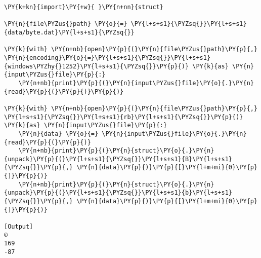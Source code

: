 \begin{Verbatim}[label=\makebox{\href{https://github.com/unipi-physics-labs/lab1-notes/tree/main/snippy/byte.py}{https://github.com/.../byte.py}},commandchars=\\\{\}]
\PY{k+kn}{import}\PY{+w}{ }\PY{n+nn}{struct}

\PY{n}{file\PYZus{}path} \PY{o}{=} \PY{l+s+s1}{\PYZsq{}}\PY{l+s+s1}{data/byte.dat}\PY{l+s+s1}{\PYZsq{}}

\PY{k}{with} \PY{n+nb}{open}\PY{p}{(}\PY{n}{file\PYZus{}path}\PY{p}{,} \PY{n}{encoding}\PY{o}{=}\PY{l+s+s1}{\PYZsq{}}\PY{l+s+s1}{windows\PYZhy{}1252}\PY{l+s+s1}{\PYZsq{}}\PY{p}{)} \PY{k}{as} \PY{n}{input\PYZus{}file}\PY{p}{:}
    \PY{n+nb}{print}\PY{p}{(}\PY{n}{input\PYZus{}file}\PY{o}{.}\PY{n}{read}\PY{p}{(}\PY{p}{)}\PY{p}{)}

\PY{k}{with} \PY{n+nb}{open}\PY{p}{(}\PY{n}{file\PYZus{}path}\PY{p}{,} \PY{l+s+s1}{\PYZsq{}}\PY{l+s+s1}{rb}\PY{l+s+s1}{\PYZsq{}}\PY{p}{)} \PY{k}{as} \PY{n}{input\PYZus{}file}\PY{p}{:}
    \PY{n}{data} \PY{o}{=} \PY{n}{input\PYZus{}file}\PY{o}{.}\PY{n}{read}\PY{p}{(}\PY{p}{)}
    \PY{n+nb}{print}\PY{p}{(}\PY{n}{struct}\PY{o}{.}\PY{n}{unpack}\PY{p}{(}\PY{l+s+s1}{\PYZsq{}}\PY{l+s+s1}{B}\PY{l+s+s1}{\PYZsq{}}\PY{p}{,} \PY{n}{data}\PY{p}{)}\PY{p}{[}\PY{l+m+mi}{0}\PY{p}{]}\PY{p}{)}
    \PY{n+nb}{print}\PY{p}{(}\PY{n}{struct}\PY{o}{.}\PY{n}{unpack}\PY{p}{(}\PY{l+s+s1}{\PYZsq{}}\PY{l+s+s1}{b}\PY{l+s+s1}{\PYZsq{}}\PY{p}{,} \PY{n}{data}\PY{p}{)}\PY{p}{[}\PY{l+m+mi}{0}\PY{p}{]}\PY{p}{)}

[Output]
©
169
-87
\end{Verbatim}
